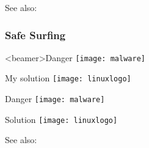 See also: 

\subsubsection{Safe Surfing}

\begin{frame}<beamer>{Danger}
  \centering
  \texttt{[image: malware]}\pause
  \begin{iblock}{My solution}
    \centering\texttt{[image: linuxlogo]}
  \end{iblock}
\end{frame}

\begin{minipage}{.6\linewidth}
  \begin{iblock}{Danger}
    \texttt{[image: malware]}
  \end{iblock}
\end{minipage}\qquad
\begin{minipage}{.3\linewidth}
  \begin{iblock}{Solution}
    \centering\texttt{[image: linuxlogo]}
  \end{iblock}
\end{minipage}

See also: 
  



